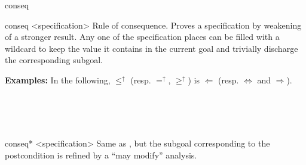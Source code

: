 \begin{tactic}{conseq}
  \begin{tsyntax}{conseq <specification>}
  Rule of consequence. Proves a specification by weakening of a
  stronger result. Any one of the specification places can be filled
  with a wildcard \tct{_} to keep the value it contains in the current
  goal and trivially discharge the corresponding subgoal.

  \textbf{Examples:} In the following, $\leq^\uparrow$ (resp. $=^\uparrow$,
  $\geq^\uparrow$) is $\Leftarrow$ (resp. $\Leftrightarrow$ and
  $\Rightarrow$).
  \begin{mathpar}
    {}%
    \quad{} \\
    {}%
    \quad{} \\
    {}%
    \quad{} \\
  \end{mathpar}
  \end{tsyntax}

  \begin{tsyntax}{conseq* <specification>}
  Same as , but the subgoal corresponding
  to the postcondition is refined by a ``may modify'' analysis.
  \end{tsyntax}
\end{tactic}
